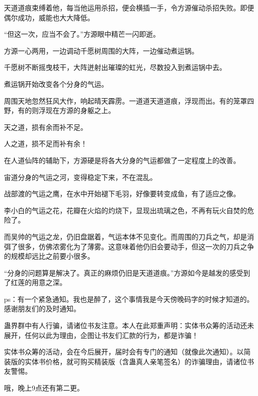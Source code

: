 \begin{this_body}
天道道痕束缚着他，每当他运用杀招，便会横插一手，令方源催动杀招失败。即便偶尔成功，威能也大大降低。

“但这一次，应当不会了。”方源眼中精芒一闪即逝。

方源一心两用，一边调动千愿树周围的大阵，一边催动煮运锅。

千愿树不断摇曳枝干，大阵迸射出璀璨的虹光，尽数投入到煮运锅中去。

煮运锅开始改变各个分身的气运。

周围天地忽然狂风大作，响起晴天霹雳。一道道天道道痕，浮现而出。有的笼罩四野，有的则浮现在方源的身躯之上。

天之道，损有余而补不足。

人之道，损不足而补有余！

在人道仙阵的辅助下，方源硬是将各大分身的气运都做了一定程度上的改善。

宙道分身的气运之河，变得稳定下来，不在混乱。

战部渡的气运之鹰，在水中开始褪下毛羽，好像要转变成鱼，有了适应之像。

李小白的气运之花，花瓣在火焰的灼烧下，显现出琉璃之色，不再有玩火自焚的危险了。

而吴帅的气运之龙，仍旧盘踞着，气运本体不见变化。而周围的刀兵之气，却是消弭了很多，仿佛浓雾化为了薄雾。这意味着他仍旧会要动手，但这一次的刀兵之争的规模却远比之前要小很多。

“分身的问题算是解决了。真正的麻烦仍旧是天道道痕。”方源如今是越发的感受到了红莲的用意之深。

ps：有一个紧急通知。我也是醉了，这个事情我是今天傍晚码字的时候才知道的。感谢朋友们的及时通知。

蛊界群中有人行骗，请诸位书友注意。本人在此郑重声明：实体书众筹的活动还未展开，任何以此为理由，企图让书友们汇款的行为，都是诈骗！

实体书众筹的活动，会在今后展开，届时会有专门的通知（就像此次通知）。以简装版的实体书价格，就可购买精装版（含蛊真人亲笔签名）的诈骗理由，请诸位书友警惕。

哦，晚上9点还有第二更。

\end{this_body}

